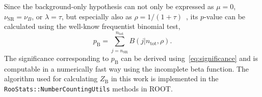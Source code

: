 Since the background-only hypothesis can not only be expressed as $\mu = 0$, $\nu_\mathrm{SR} = \nu_B$, or $\lambda = \tau$, but especially also as $\rho = 1/(1+\tau)$~\cite{Cousins:2007bmb}, its $p$-value can be calculated using the well-know frequentist binomial test,
\begin{equation}
	p_\mathrm{B} = \sum_{j=n_\mathrm{SR}}^{n_\mathrm{tot}} B (j\vert n_\mathrm{tot}, \rho).
\end{equation}
The significance corresponding to $p_\mathrm{B}$ can be derived using~\cref{eq:significance} and is computable in a numerically fast way using the incomplete beta function. The algorithm used for calculating $Z_\mathrm{B}$ in this work is implemented in the \texttt{RooStats::NumberCountingUtils} methods in \textsc{ROOT}.



